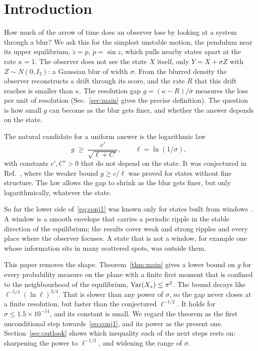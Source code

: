 \section{Introduction}
\label{sec:intro}

How much of the arrow of time does an observer lose by looking at a system through a blur?
We ask this for the simplest unstable motion, the pendulum near its upper equilibrium, $\dot z=p$, $\dot p=\sin z$, which pulls nearby states apart at the rate $\kappa=1$.
The observer does not see the state $X$ itself, only $Y=X+\sigma Z$ with $Z\sim N(0,I_2)$: a Gaussian blur of width $\sigma$.
From the blurred density the observer reconstructs a drift through its score, and the rate $R$ that this drift reaches is smaller than $\kappa$.
The resolution gap $g=(\kappa-R)/\sigma$ measures the loss per unit of resolution (Sec.~\ref{sec:main} gives the precise definition).
The question is how small $g$ can become as the blur gets finer, and whether the answer depends on the state.

The natural candidate for a uniform answer is the logarithmic law
\begin{equation}
g\;\ge\;\frac{c'}{\sqrt{\ell+C'}},\qquad \ell=\ln(1/\sigma),
\label{eq:conj1}
\end{equation}
with constants $c',C'>0$ that do not depend on the state.
It was conjectured in Ref.~\cite{E}, where the weaker bound $g\ge c/\ell$ was proved for states without fine structure.
The law allows the gap to shrink as the blur gets finer, but only logarithmically, whatever the state.

So far the lower side of~\eqref{eq:conj1} was known only for states built from windows~\cite{F,H,I,J}.
A window is a smooth envelope that carries a periodic ripple in the stable direction of the equilibrium; the results cover weak and strong ripples and every place where the observer focuses.
A state that is not a window, for example one whose information sits in many scattered spots, was outside them.

This paper removes the shape.
Theorem~\ref{thm:main} gives a lower bound on $g$ for every probability measure on the plane with a finite first moment that is confined to the neighbourhood of the equilibrium, $\operatorname{Var}(X_z)\le\pi^2$.
The bound decays like $\ell^{-5/4}(\ln\ell)^{3/4}$.
That is slower than any power of $\sigma$, so the gap never closes at a finite resolution, but faster than the conjectured $\ell^{-1/2}$.
It holds for $\sigma\le1.5\times10^{-14}$, and its constant is small.
We regard the theorem as the first unconditional step towards~\eqref{eq:conj1}, and its power as the present one.
Section~\ref{sec:outlook} shows which inequality each of the next steps rests on: sharpening the power to $\ell^{-1/2}$, and widening the range of $\sigma$.

